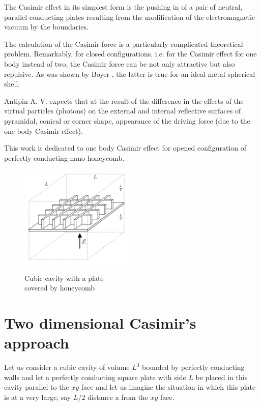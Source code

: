 \documentclass[11pt]{article}
\begin{document}
The Casimir effect in its simplest form is the pushing in of a pair of
neutral, parallel conducting plates resulting from the modification of
the electromagnetic vacuum by the boundaries.

The calculation of the Casimir force is a particularly complicated
theoretical problem. Remarkably, for closed configurations, i.e. for the
Casimir effect for one body instead of two, the Casimir force can be not
only attractive but also repulsive. As was shown by Boyer
\cite{Boyer1968}, the latter is true for an ideal metal spherical shell.

Antipin A. V. \cite{Antipin2012} expects that at the result of the
difference in the effects of the virtual particles (photons) on the
external and internal reflective surfaces of pyramidal, conical or
corner shape, appearance of the driving force (due to the one body
Casimir effect).

This work is dedicated to one body Casimir effect for opened
configuration of perfectly conducting nano honeycomb.

    \begin{figure}
\begin{center}
\includegraphics[width=0.48\textwidth]{honeycomb_box_L.png}
\caption{}{Cubic cavity with a plate \\ covered by honeycomb}
\end{center}
\label{fig:honeycomb_box_L}
\end{figure}

    \section{Two dimensional Casimir's
approach}\label{two-dimensional-casimirs-approach}

    Let us consider a cubic cavity of volume \(L^3\) bounded by perfectly
conducting walls and let a perfectly conducting square plate with side
\(L\) be placed in this cavity parallel to the \(xy\) face and let us
imagine the situation in which this plate is at a very large, say
\(L/2\) distance a from the \(xy\) face.
\end{document}
